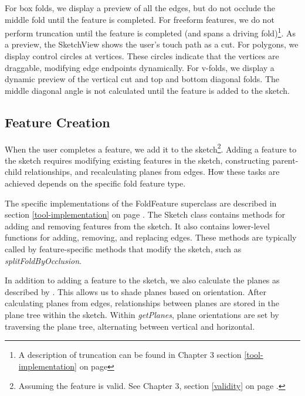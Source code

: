 For box folds, we display a preview of all the edges, but do not occlude
the middle fold until the feature is completed. For freeform features,
we do not perform truncation until the feature is completed (and spans a
driving fold)\footnote{A description of truncation can be found in
  Chapter 3 section \ref{tool-implementation}
   on page \pageref{tool-implementation}}.
As a preview, the SketchView shows the user's touch path as a cut. For
polygons, we display control circles at vertices. These circles indicate
that the vertices are draggable, modifying edge endpoints dynamically.
For v-folds, we display a dynamic preview of the vertical cut and top
and bottom diagonal folds. The middle diagonal angle is not calculated
until the feature is added to the sketch.

\subsection{Feature Creation}\label{feature-creation}

When the user completes a feature, we add it to the sketch\footnote{Assuming
  the feature is valid. See Chapter 3, section \ref{validity}
   on page \pageref{validity}.}. Adding a feature to
the sketch requires modifying existing features in the sketch,
constructing parent-child relationships, and recalculating planes from
edges. How these tasks are achieved depends on the specific fold feature
type.

The specific implementations of the FoldFeature superclass are described
in section \ref{tool-implementation}  on
page \pageref{tool-implementation}. The Sketch class contains methods
for adding and removing features from the sketch. It also contains
lower-level functions for adding, removing, and replacing edges. These
methods are typically called by feature-specific methods that modify the
sketch, such as \emph{splitFoldByOcclusion}.

In addition to adding a feature to the sketch, we also calculate the
planes as described by \citet{mallen}. This allows us to shade planes
based on orientation. After calculating planes from edges, relationships
between planes are stored in the plane tree within the sketch. Within
\emph{getPlanes}, plane orientations are set by traversing the plane
tree, alternating between vertical and horizontal.
